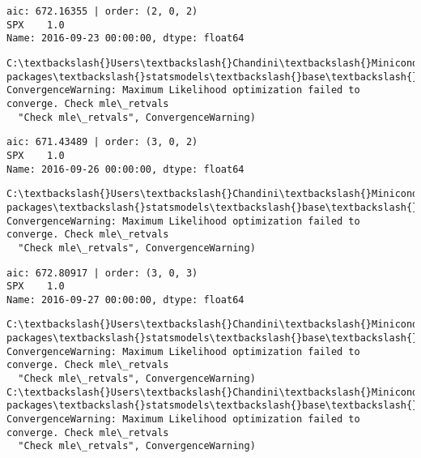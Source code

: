 \documentclass[11pt]{article}
\begin{document}
    \begin{Verbatim}[commandchars=\\\{\}]
aic: 672.16355 | order: (2, 0, 2)
SPX    1.0
Name: 2016-09-23 00:00:00, dtype: float64

    \end{Verbatim}

    \begin{Verbatim}[commandchars=\\\{\}]
C:\textbackslash{}Users\textbackslash{}Chandini\textbackslash{}Miniconda3\textbackslash{}envs\textbackslash{}auquan\textbackslash{}lib\textbackslash{}site-packages\textbackslash{}statsmodels\textbackslash{}base\textbackslash{}model.py:496: ConvergenceWarning: Maximum Likelihood optimization failed to converge. Check mle\_retvals
  "Check mle\_retvals", ConvergenceWarning)

    \end{Verbatim}

    \begin{Verbatim}[commandchars=\\\{\}]
aic: 671.43489 | order: (3, 0, 2)
SPX    1.0
Name: 2016-09-26 00:00:00, dtype: float64

    \end{Verbatim}

    \begin{Verbatim}[commandchars=\\\{\}]
C:\textbackslash{}Users\textbackslash{}Chandini\textbackslash{}Miniconda3\textbackslash{}envs\textbackslash{}auquan\textbackslash{}lib\textbackslash{}site-packages\textbackslash{}statsmodels\textbackslash{}base\textbackslash{}model.py:496: ConvergenceWarning: Maximum Likelihood optimization failed to converge. Check mle\_retvals
  "Check mle\_retvals", ConvergenceWarning)

    \end{Verbatim}

    \begin{Verbatim}[commandchars=\\\{\}]
aic: 672.80917 | order: (3, 0, 3)
SPX    1.0
Name: 2016-09-27 00:00:00, dtype: float64

    \end{Verbatim}

    \begin{Verbatim}[commandchars=\\\{\}]
C:\textbackslash{}Users\textbackslash{}Chandini\textbackslash{}Miniconda3\textbackslash{}envs\textbackslash{}auquan\textbackslash{}lib\textbackslash{}site-packages\textbackslash{}statsmodels\textbackslash{}base\textbackslash{}model.py:496: ConvergenceWarning: Maximum Likelihood optimization failed to converge. Check mle\_retvals
  "Check mle\_retvals", ConvergenceWarning)
C:\textbackslash{}Users\textbackslash{}Chandini\textbackslash{}Miniconda3\textbackslash{}envs\textbackslash{}auquan\textbackslash{}lib\textbackslash{}site-packages\textbackslash{}statsmodels\textbackslash{}base\textbackslash{}model.py:496: ConvergenceWarning: Maximum Likelihood optimization failed to converge. Check mle\_retvals
  "Check mle\_retvals", ConvergenceWarning)

    \end{Verbatim}
\end{document}
